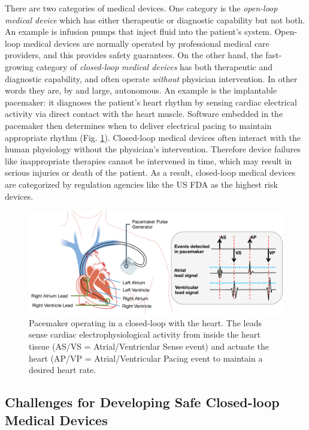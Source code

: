 There are two categories of medical devices. 
One category is the \emph{open-loop medical device} which has either therapeutic or diagnostic capability but not both.
An example is infusion pumps that inject fluid into the patient's system.
Open-loop medical devices are normally operated by professional medical care providers, and this provides safety guarantees.
On the other hand, the fast-growing category of \emph{closed-loop medical devices} has both therapeutic and diagnostic capability, and often operate \emph{without} physician intervention.
In other words they are, by and large, autonomous.
An example is the implantable pacemaker: it diagnoses the patient's heart rhythm by sensing cardiac electrical activity via direct contact with the heart muscle.
Software embedded in the pacemaker then determines when to deliver electrical pacing to maintain appropriate rhythm (Fig. \ref{fig:pacemaker}). 
Closed-loop medical devices often interact with the human physiology without the physician's intervention.
Therefore device failures like inappropriate therapies cannot be intervened in time, which may result in serious injuries or death of the patient.
As a result, closed-loop medical devices are categorized by regulation agencies like the US FDA as the highest risk devices.
\begin{figure}[t]
	\centering
	\includegraphics[scale=0.33]{figs/fig1pacemaker.pdf}
	\caption{\small Pacemaker operating in a closed-loop with the heart. The leads sense cardiac electrophysiological activity from inside the heart tissue (AS/VS = Atrial/Ventricular Sense event) and actuate the heart (AP/VP = Atrial/Ventricular Pacing event to maintain a desired heart rate.}
	\label{fig:pacemaker}
\end{figure}

\subsection{Challenges for Developing Safe Closed-loop Medical Devices}
